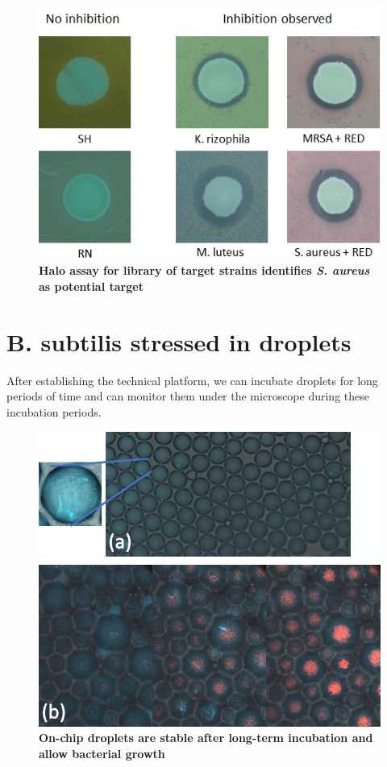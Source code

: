 \begin{figure}
\centering
\includegraphics[width=\linewidth]{graphics/2025_09_28_droplets_fig4.png}
\caption{\textbf{Halo assay for library of target strains identifies \textit{S. aureus} as potential target}}
\label{fig:results_sensitive_screening}
\end{figure}

\section{B. subtilis stressed in droplets}
After establishing the technical platform, we can incubate droplets for long periods of time and can monitor them under the microscope during these incubation periods.

\begin{figure}
\centering
\includegraphics[width=\linewidth]{graphics/2025_09_28_droplets_fig5.png}
\caption{\textbf{On-chip droplets are stable after long-term incubation and allow bacterial growth}}
\label{fig:results_incubation_subtilis}
\end{figure}

